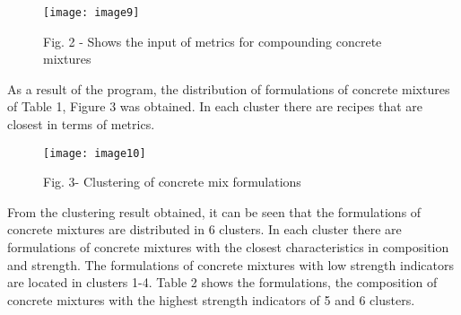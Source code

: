 \begin{figure}
  \centering
  \texttt{[image: image9]}
  \caption*{Fig. 2 - Shows the input of metrics for compounding concrete mixtures}
\end{figure}

As a result of the program, the distribution of formulations of concrete
mixtures of Table 1, Figure 3 was obtained. In each cluster there are
recipes that are closest in terms of metrics.

\begin{figure}
  \centering
  \texttt{[image: image10]}
  \caption*{Fig. 3- Clustering of concrete mix formulations}
\end{figure}

From the clustering result obtained, it can be seen that the
formulations of concrete mixtures are distributed in 6 clusters. In each
cluster there are formulations of concrete mixtures with the closest
characteristics in composition and strength. The formulations of
concrete mixtures with low strength indicators are located in clusters
1-4. Table 2 shows the formulations, the composition of concrete
mixtures with the highest strength indicators of 5 and 6 clusters.



